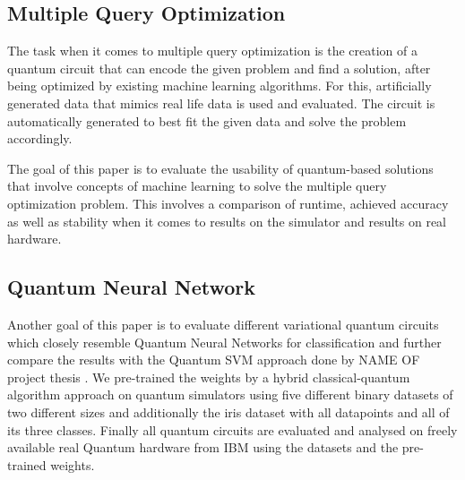 \subsection{Multiple Query Optimization}
The task when it comes to multiple query optimization is the creation of a quantum circuit that can encode the given problem and find a solution, after being optimized by existing machine learning algorithms. For this, artificially generated data that mimics real life data is used and evaluated. The circuit is automatically generated to best fit the given data and solve the problem accordingly. \par
The goal of this paper is to evaluate the usability of quantum-based solutions that involve concepts of machine learning to solve the multiple query optimization problem. This involves a comparison of runtime, achieved accuracy as well as stability when it comes to results on the simulator and results on real hardware.

\subsection{Quantum Neural Network}
Another goal of this paper is to evaluate different variational quantum circuits which closely resemble Quantum Neural Networks for classification and further compare the results with the Quantum SVM approach done by NAME OF project thesis . We pre-trained the weights by a hybrid classical-quantum algorithm approach on quantum simulators using five different binary datasets of two different sizes and additionally the iris dataset with all datapoints and all of its three classes. Finally all quantum circuits are evaluated and analysed on freely available real Quantum hardware from IBM using the datasets and the pre-trained weights.

\clearpage
